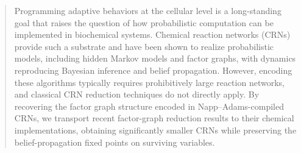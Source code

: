 \documentclass{article}
\theoremstyle{plain}
\theoremstyle{definition}
\theoremstyle{remark}
\newcommand{\<}{\langle}
\renewcommand{\>}{\rangle}
\begin{document}
\begin{abstract}

Programming adaptive behaviors at the cellular level is a long-standing goal that raises the question of how probabilistic computation can be implemented in biochemical systems. Chemical reaction networks (CRNs) provide such a substrate and have been shown to realize probabilistic models, including hidden Markov models and factor graphs, with dynamics reproducing Bayesian inference and belief propagation. However, encoding these algorithms typically requires prohibitively large reaction networks, and classical CRN reduction techniques do not directly apply. By recovering the factor graph structure encoded in Napp--Adams-compiled CRNs, we transport recent factor-graph reduction results to their chemical implementations, obtaining significantly smaller CRNs while preserving the
belief-propagation fixed points on surviving variables.


\end{abstract}
\end{document}
